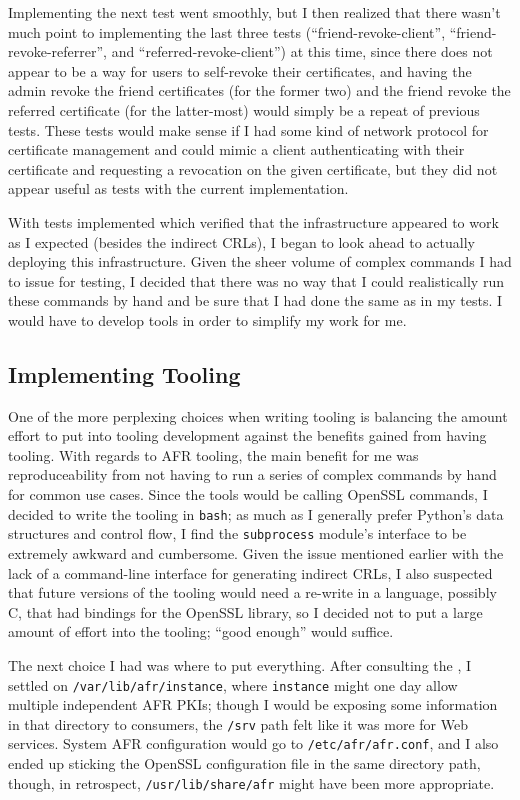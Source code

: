 \documentclass{article}
\begin{document}
Implementing the next test went smoothly, but I then realized that there wasn't much point to implementing the last three tests (``friend-revoke-client'', ``friend-revoke-referrer'', and ``referred-revoke-client'') at this time, since there does not appear to be a way for users to self-revoke their certificates, and having the admin revoke the friend certificates (for the former two) and the friend revoke the referred certificate (for the latter-most) would simply be a repeat of previous tests.  These tests would make sense if I had some kind of network protocol for certificate management and could mimic a client authenticating with their certificate and requesting a revocation on the given certificate, but they did not appear useful as tests with the current implementation.

With tests implemented which verified that the infrastructure appeared to work as I expected (besides the indirect CRLs), I began to look ahead to actually deploying this infrastructure.  Given the sheer volume of complex commands I had to issue for testing, I decided that there was no way that I could realistically run these commands by hand and be sure that I had done the same as in my tests.  I would have to develop tools in order to simplify my work for me.

\subsection{Implementing Tooling}
One of the more perplexing choices when writing tooling is balancing the amount effort to put into tooling development against the benefits gained from having tooling.  With regards to AFR tooling, the main benefit for me was reproduceability from not having to run a series of complex commands by hand for common use cases.  Since the tools would be calling OpenSSL commands, I decided to write the tooling in \texttt{bash}; as much as I generally prefer Python's data structures and control flow, I find the \texttt{subprocess} module's interface to be extremely awkward and cumbersome.  Given the issue mentioned earlier with the lack of a command-line interface for generating indirect CRLs, I also suspected that future versions of the tooling would need a re-write in a language, possibly C, that had bindings for the OpenSSL library, so I decided not to put a large amount of effort into the tooling; ``good enough'' would suffice.

The next choice I had was where to put everything.  After consulting the , I settled on \texttt{/var/lib/afr/instance}, where \texttt{instance} might one day allow multiple independent AFR PKIs; though I would be exposing some information in that directory to consumers, the \texttt{/srv} path felt like it was more for Web services.  System AFR configuration would go to \texttt{/etc/afr/afr.conf}, and I also ended up sticking the OpenSSL configuration file in the same directory path, though, in retrospect, \texttt{/usr/lib/share/afr} might have been more appropriate.
\end{document}
